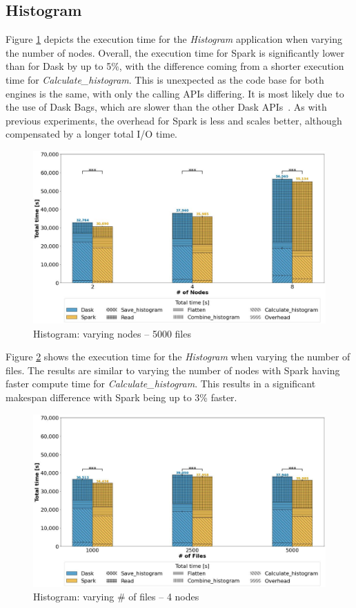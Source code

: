 \documentclass[AMA,STIX1COL]{WileyNJD-v2}
\newcommand{\HL}[1]{#1}
\begin{document}
\subsection{Histogram}
Figure \ref{fig:histogram_worker} depicts the execution time for the \textit{Histogram} application when varying the number of nodes.
Overall, the execution time for Spark is significantly lower than for Dask by up to 5\%, with the difference coming from a shorter execution time for \textit{Calculate\_histogram}.
This is unexpected as the code base for both engines is the same, with only the calling APIs differing.
It is most likely due to the use of Dask Bags, which are slower than the other Dask APIs\HL{~{\cite{DaskBagDoc}}}.
As with previous experiments, the overhead for Spark is less and scales better, although compensated by a longer total I/O time.
\begin{figure}[!h]
	\centering
	\includegraphics[clip,width=0.75\columnwidth]{figures/stacked_histogram_worker.jpg}
	\caption{Histogram: varying nodes -- 5000 files}
	\label{fig:histogram_worker}
\end{figure}
															
Figure \ref{fig:histogram_block} shows the execution time for the \textit{Histogram} when varying the number of files.
The results are similar to varying the number of nodes with Spark having faster compute time for \textit{Calculate\_histogram}.
This results in a significant makespan difference with Spark being up to 3\% faster.
\begin{figure}[!h]
	\centering
	\includegraphics[clip,width=0.75\columnwidth]{figures/stacked_histogram_block.jpg}
	\caption{Histogram: varying \# of files -- 4 nodes}
	\label{fig:histogram_block}
\end{figure}
													
\end{document}
